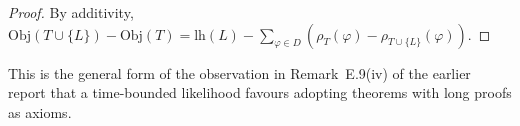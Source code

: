 \begin{proof}
By additivity, $\mathrm{Obj}(T\cup\{L\})-\mathrm{Obj}(T)=\mathrm{lh}(L)-\sum_{\varphi\in D}(\rho_T(\varphi)-\rho_{T\cup\{L\}}(\varphi))$.
\end{proof}

This is the general form of the observation in Remark~E.9(iv) of the earlier report that a time-bounded likelihood favours adopting theorems with long proofs as axioms.
